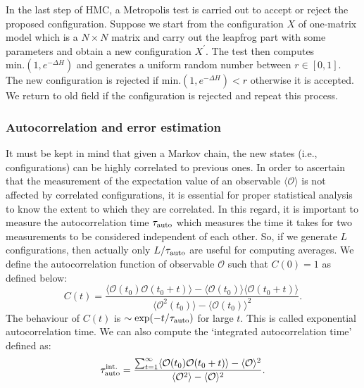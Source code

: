 \documentclass[letter,11pt]{article}
\begin{document}
\vspace{4mm} 
In the last step of HMC, a Metropolis test is carried out to accept or reject the proposed
configuration. Suppose we start from the configuration $X$ of one-matrix model 
which is a $N \times N$ matrix and carry out the leapfrog part with some parameters and obtain a new configuration 
$X^{\prime}$. The test then computes \texttt{$\text{min.}(1, e^{-\Delta H})$} and generates 
a uniform random number between $r \in [0,1]$. The new configuration is 
rejected if \texttt{$\text{min.}(1, e^{-\Delta H}) < r$} otherwise it is accepted. 
We return to old field if the configuration is rejected and repeat this process. 
\subsubsection{\label{sec:autocorr}Autocorrelation and error estimation} 
It must be kept in mind that given a Markov chain, the new states 
(i.e., configurations) can be highly correlated to previous ones. 
In order to ascertain that the measurement of the expectation value of an observable $\langle \mathcal{O} \rangle$ is not affected by correlated configurations, it is essential for proper statistical analysis to know the extent to which they are correlated. In this regard, it is important to measure
the autocorrelation time $ \tau_{\rm{auto}}$ which measures the time it takes for two measurements to be considered independent of each other. So, if we generate $L$ configurations, then actually only $L/\tau_{\rm{auto}}$ are useful for computing averages.
We define the autocorrelation function of observable $\mathcal{O}$ such that
$C(0) = 1$ as defined below:
 \begin{equation}
 	C(t) = \frac{\langle \mathcal{O}(t_0) \mathcal{O}(t_0 + t) \rangle - \langle \mathcal{O}(t_0)\rangle \langle \mathcal{O}(t_0 + t) \rangle}{\langle \mathcal{O}^2(t_0)\rangle - \langle \mathcal{O}(t_0)\rangle^{2}}.
 \end{equation}
The behaviour of $C(t)$ is $\sim \exp(-t/\tau_{\rm{auto}})$ for large $t$. This is called exponential autocorrelation time. We can also compute the `integrated autocorrelation time' defined as:
\begin{equation}
	\tau_{\rm{auto}}^{\rm{int.}} = \frac{\sum_{t=1}^{\infty} \langle \mathcal{O}(t_0) \mathcal{O}(t_0 + t) \rangle - \langle \mathcal{O} \rangle^2 }{\langle \mathcal{O}^2\rangle - \langle \mathcal{O}\rangle^{2}}.
\end{equation}
\end{document}
